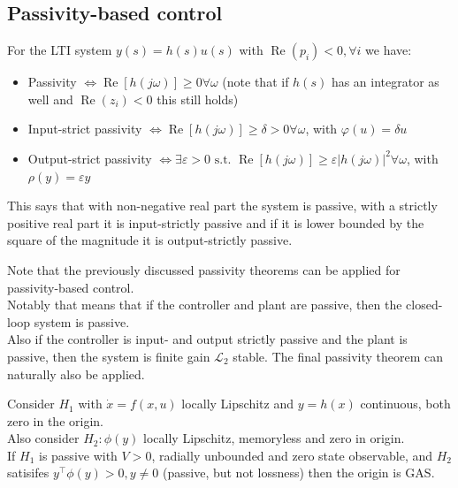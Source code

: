 \subsection{Passivity-based control}


\begin{tcolorbox}[colback=white, colframe=teal]
\begin{theorem}
    For the LTI system $y(s)=h(s)u(s)$ with $\operatorname{Re}\left(p_{i}\right)<0, \forall i$ we have:
    \begin{itemize}[topsep=0pt]
        \item Passivity $\Leftrightarrow \operatorname{Re}[h(j \omega)] \geq 0 \forall \omega$ (note that if $h(s)$ has an integrator as well and $\operatorname{Re}\left(z_{i}\right)<0$ this still holds)
        \item Input-strict passivity $\Leftrightarrow \operatorname{Re}[h(j \omega)] \geq \delta>0 \forall \omega$, with $\varphi(u)=\delta u$
        \item Output-strict passivity $\Leftrightarrow \exists \varepsilon>0 \text { s.t. } \operatorname{Re}[h(j \omega)] \geq \varepsilon|h(j \omega)|^{2} \forall \omega$, with $\rho(y)=\varepsilon y$
    \end{itemize}
\end{theorem}
\end{tcolorbox}
\begin{remark}
    This says that with non-negative real part the system is passive, with a strictly positive real part it is input-strictly passive and if it  is lower bounded by the square of the magnitude it is output-strictly passive.
\end{remark}

\begin{remark}
    Note that the previously discussed passivity theorems can be applied for passivity-based control. \\
    Notably that means that if the controller and plant are passive, then the closed-loop system is passive.\\
    Also if the controller is input- and output strictly passive and the plant is passive, then the system is finite gain $\mathscr{L}_2$ stable.
    The final passivity theorem can naturally also be applied.
\end{remark}

\begin{tcolorbox}[colback=white, colframe=teal]
\begin{theorem}
    Consider $H_{1}$ with $\dot{x}=f(x, u)$ locally Lipschitz and $y = h(x)$ continuous, both zero in the origin.\\
     Also consider $H_2 :\phi(y)$ locally Lipschitz, memoryless and zero in origin.\\
     If $H_1$ is passive with $V>0$, radially unbounded and zero state observable, and $H_2$ satisifes $y^{\top} \phi(y) > 0, y \neq 0$ (passive, but not lossness) then the origin is GAS.
\end{theorem}
\end{tcolorbox}

